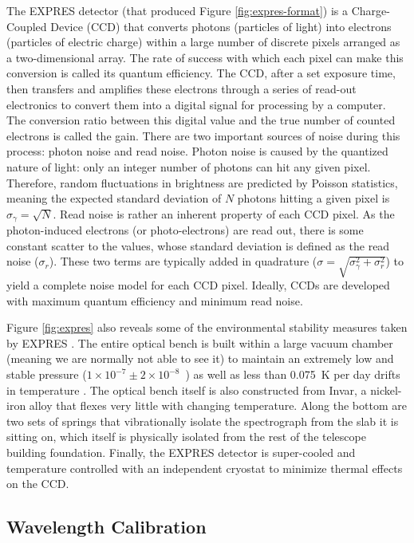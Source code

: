 The EXPRES detector (that produced Figure \ref{fig:expres-format}) is a Charge-Coupled Device (CCD) that converts photons (particles of light) into electrons (particles of electric charge) within a large number of discrete pixels arranged as a two-dimensional array. The rate of success with which each pixel can make this conversion is called its quantum efficiency. The CCD, after a set exposure time, then transfers and amplifies these electrons through a series of read-out electronics to convert them into a digital signal for processing by a computer. The conversion ratio between this digital value and the true number of counted electrons is called the gain. There are two important sources of noise during this process: photon noise and read noise. Photon noise is caused by the quantized nature of light: only an integer number of photons can hit any given pixel. Therefore, random fluctuations in brightness are predicted by Poisson statistics, meaning the expected standard deviation of $N$ photons hitting a given pixel is $\sigma_\gamma=\sqrt{N}$. Read noise is rather an inherent property of each CCD pixel. As the photon-induced electrons (or photo-electrons) are read out, there is some constant scatter to the values, whose standard deviation is defined as the read noise ($\sigma_r$). These two terms are typically added in quadrature ($\sigma=\sqrt{\sigma_\gamma^2 + \sigma_r^2}$) to yield a complete noise model for each CCD pixel. Ideally, CCDs are developed with maximum quantum efficiency and minimum read noise.

Figure \ref{fig:expres} also reveals some of the environmental stability measures taken by EXPRES \citep{jurgenson_expres_2016}. The entire optical bench is built within a large vacuum chamber (meaning we are normally not able to see it) to maintain an extremely low and stable pressure ($1\times 10^{-7} \pm 2\times 10^{-8}$~\si{\torr}) as well as less than 0.075~\si{\kelvin} per day drifts in temperature \citep{blackman_performance_2020}. The optical bench itself is also constructed from Invar, a nickel-iron alloy that flexes very little with changing temperature. Along the bottom are two sets of springs that vibrationally isolate the spectrograph from the slab it is sitting on, which itself is physically isolated from the rest of the telescope building foundation. Finally, the EXPRES detector is super-cooled and temperature controlled with an independent cryostat to minimize thermal effects on the CCD.

\subsection{Wavelength Calibration} \label{intro:wvln_cal}

